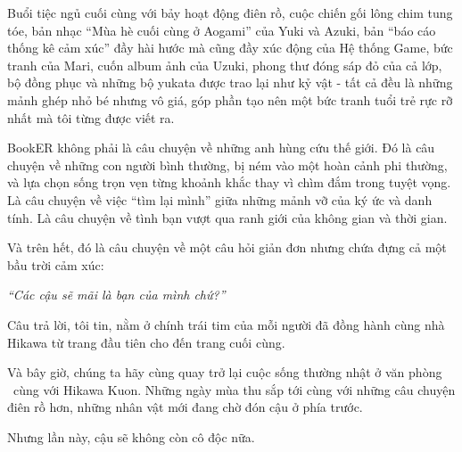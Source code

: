 \documentclass[main.tex]{subfiles}
\begin{document}
Buổi tiệc ngủ cuối cùng với bảy hoạt động điên rồ, cuộc chiến gối lông chim tung tóe, bản nhạc ``Mùa hè cuối cùng ở Aogami'' của Yuki và Azuki, bản ``báo cáo thống kê cảm xúc'' đầy hài hước mà cũng đầy xúc động của Hệ thống Game, bức tranh của Mari, cuốn album ảnh của Uzuki, phong thư đóng sáp đỏ của cả lớp, bộ đồng phục và những bộ yukata được trao lại như kỷ vật - tất cả đều là những mảnh ghép nhỏ bé nhưng vô giá, góp phần tạo nên một bức tranh tuổi trẻ rực rỡ nhất mà tôi từng được viết ra.

BookER không phải là câu chuyện về những anh hùng cứu thế giới. Đó là câu chuyện về những con người bình thường, bị ném vào một hoàn cảnh phi thường, và lựa chọn sống trọn vẹn từng khoảnh khắc thay vì chìm đắm trong tuyệt vọng. Là câu chuyện về việc ``tìm lại mình'' giữa những mảnh vỡ của ký ức và danh tính. Là câu chuyện về tình bạn vượt qua ranh giới của không gian và thời gian.

Và trên hết, đó là câu chuyện về một câu hỏi giản đơn nhưng chứa đựng cả một bầu trời cảm xúc:

\vspace{1em}
\begin{center}
    \textit{``Các cậu sẽ mãi là bạn của mình chứ?''}
\end{center}
\vspace{1em}

Câu trả lời, tôi tin, nằm ở chính trái tim của mỗi người đã đồng hành cùng nhà Hikawa từ trang đầu tiên cho đến trang cuối cùng.

Và bây giờ, chúng ta hãy cùng quay trở lại cuộc sống thường nhật ở văn phòng \hll\ cùng với Hikawa Kuon. Những ngày mùa thu sắp tới cùng với những câu chuyện điên rồ hơn, những nhân vật mới đang chờ đón cậu ở phía trước.

Nhưng lần này, cậu sẽ không còn cô độc nữa.
\end{document}
